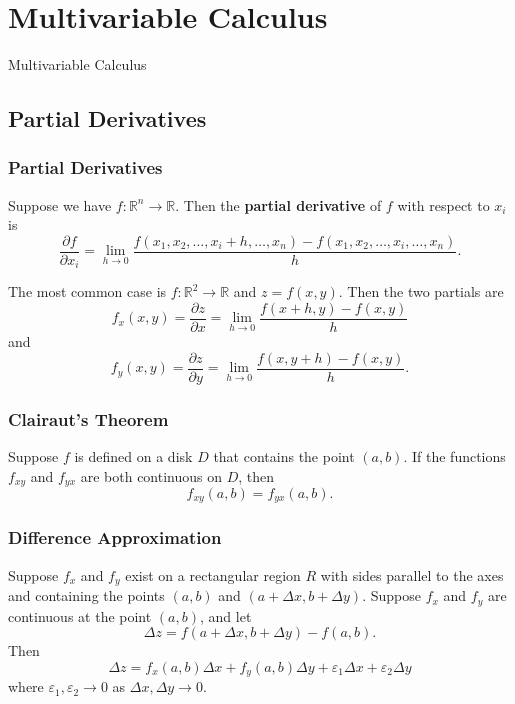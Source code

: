 \documentclass{beamer}
\begin{document}
\section{Multivariable Calculus}
\begin{frame}
\begin{center}
\Huge Multivariable Calculus
\end{center}
\end{frame}


\subsection{Partial Derivatives}

\begin{frame}
\frametitle{Partial Derivatives}
{\small 
\begin{Definition}
Suppose we have $f:\mathbb{R}^n \to \mathbb{R}$. Then the {\bf partial derivative} of $f$ with respect to $x_i$ is
$$
\frac{\partial f}{\partial x_i} = \lim_{h\to 0} \frac{f(x_1, x_2,\ldots, x_i + h,\ldots, x_n) - f(x_1, x_2,\ldots, x_i,\ldots, x_n)}{h}.
$$
\end{Definition}
The most common case is $f:\mathbb{R}^2\to \mathbb{R}$ and $z = f(x, y)$. Then the two partials are
$$
f_x(x, y) = \frac{\partial z}{\partial x} = \lim_{h\to 0 } \frac{f(x + h, y) - f(x, y)}{h}
$$
and
$$
f_y(x, y) = \frac{\partial z}{\partial y} = \lim_{h\to 0 } \frac{f(x, y + h) - f(x, y)}{h}.
$$

}
\end{frame}

\begin{frame}
\frametitle{Clairaut's Theorem}

\begin{Theorem}[Clairaut]
Suppose $f$ is defined on a disk $D$ that contains the point $(a, b)$. If the functions $f_{xy}$ and $f_{yx}$ are both continuous on $D$, then
$$
f_{xy}(a, b) = f_{yx}(a, b).
$$
\end{Theorem}

\end{frame}

\begin{frame}
\frametitle{Difference Approximation}

\begin{Theorem}
Suppose $f_x$ and $f_y$ exist on a rectangular region $R$ with sides parallel to the axes and containing the points $(a, b)$ and $(a + \Delta x, b + \Delta y)$. Suppose $f_x$ and $f_y$ are continuous at the point $(a, b)$, and let
$$
\Delta z = f(a + \Delta x, b + \Delta y) - f(a, b).
$$
Then
$$
\Delta z = f_x(a, b)\Delta x + f_y(a, b)\Delta y + \varepsilon_1\Delta x + \varepsilon_2\Delta y
$$
where $\varepsilon_1,\varepsilon_2\to 0$ as $\Delta x,\Delta y\to 0$.

\end{Theorem}

\end{frame}
\end{document}
